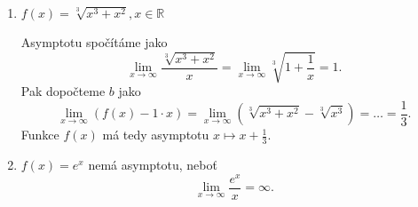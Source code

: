 \begin{priklad}\,
\begin{enumerate}[(1)]
	\item $f(x)=\sqrt[3]{x^3+x^2}, x \in \mathbb R $
	\par Asymptotu spočítáme jako
	$$
 \lim_{x \to \infty} \frac{\sqrt[3]{x^3+x^2}}{x} = \lim_{x \to \infty} \sqrt[3]{1+\frac{1}{x}}=1.
	$$
	Pak dopočteme $b$ jako
	$$
 \lim_{x \to \infty} (f(x)-1\cdot x) = \lim_{x \to \infty} \left( \sqrt[3]{x^3+x^2}-\sqrt[3]{x^3} \right ) = \dots = \frac{1}{3}.
	$$
	Funkce $f(x)$ má tedy asymptotu $x\mapsto x+\frac{1}{3}$.
	\item $f(x)=e^x$ nemá asymptotu, neboť
	$$
 \lim_{x \to \infty} \frac{e^x}{x}=\infty.
	$$
\end{enumerate}
\end{priklad}
